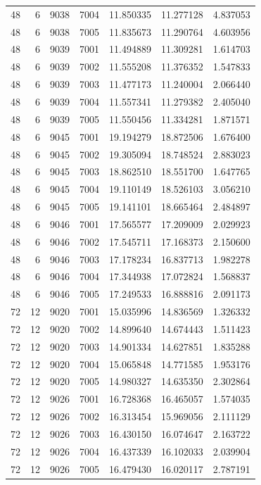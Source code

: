 \begin{table}
\begin{tabular}{rrrrrrr}
48 & 6 & 9038 & 7004 & 11.850335 & 11.277128 & 4.837053 \\
48 & 6 & 9038 & 7005 & 11.835673 & 11.290764 & 4.603956 \\
48 & 6 & 9039 & 7001 & 11.494889 & 11.309281 & 1.614703 \\
48 & 6 & 9039 & 7002 & 11.555208 & 11.376352 & 1.547833 \\
48 & 6 & 9039 & 7003 & 11.477173 & 11.240004 & 2.066440 \\
48 & 6 & 9039 & 7004 & 11.557341 & 11.279382 & 2.405040 \\
48 & 6 & 9039 & 7005 & 11.550456 & 11.334281 & 1.871571 \\
48 & 6 & 9045 & 7001 & 19.194279 & 18.872506 & 1.676400 \\
48 & 6 & 9045 & 7002 & 19.305094 & 18.748524 & 2.883023 \\
48 & 6 & 9045 & 7003 & 18.862510 & 18.551700 & 1.647765 \\
48 & 6 & 9045 & 7004 & 19.110149 & 18.526103 & 3.056210 \\
48 & 6 & 9045 & 7005 & 19.141101 & 18.665464 & 2.484897 \\
48 & 6 & 9046 & 7001 & 17.565577 & 17.209009 & 2.029923 \\
48 & 6 & 9046 & 7002 & 17.545711 & 17.168373 & 2.150600 \\
48 & 6 & 9046 & 7003 & 17.178234 & 16.837713 & 1.982278 \\
48 & 6 & 9046 & 7004 & 17.344938 & 17.072824 & 1.568837 \\
48 & 6 & 9046 & 7005 & 17.249533 & 16.888816 & 2.091173 \\
72 & 12 & 9020 & 7001 & 15.035996 & 14.836569 & 1.326332 \\
72 & 12 & 9020 & 7002 & 14.899640 & 14.674443 & 1.511423 \\
72 & 12 & 9020 & 7003 & 14.901334 & 14.627851 & 1.835288 \\
72 & 12 & 9020 & 7004 & 15.065848 & 14.771585 & 1.953176 \\
72 & 12 & 9020 & 7005 & 14.980327 & 14.635350 & 2.302864 \\
72 & 12 & 9026 & 7001 & 16.728368 & 16.465057 & 1.574035 \\
72 & 12 & 9026 & 7002 & 16.313454 & 15.969056 & 2.111129 \\
72 & 12 & 9026 & 7003 & 16.430150 & 16.074647 & 2.163722 \\
72 & 12 & 9026 & 7004 & 16.437339 & 16.102033 & 2.039904 \\
72 & 12 & 9026 & 7005 & 16.479430 & 16.020117 & 2.787191 \\

\end{tabular}
\end{table}
